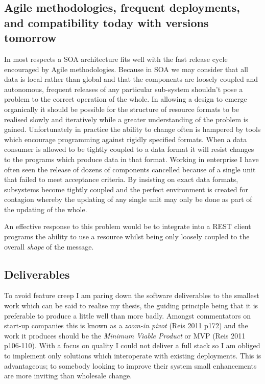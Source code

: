 \documentclass[12pt, ]{article}
\begin{document}
\subsection{Agile methodologies, frequent deployments, and compatibility
today with versions
tomorrow}\label{agile-methodologies-frequent-deployments-and-compatibility-today-with-versions-tomorrow}

In most respects a SOA architecture fits well with the fast release
cycle encouraged by Agile methodologies. Because in SOA we may consider
that all data is local rather than global and that the components are
loosely coupled and autonomous, frequent releases of any particular
sub-system shouldn't pose a problem to the correct operation of the
whole. In allowing a design to emerge organically it should be possible
for the structure of resource formats to be realised slowly and
iteratively while a greater understanding of the problem is gained.
Unfortunately in practice the ability to change often is hampered by
tools which encourage programming against rigidly specified formats.
When a data consumer is allowed to be tightly coupled to a data format
it will resist changes to the programs which produce data in that
format. Working in enterprise I have often seen the release of dozens of
components cancelled because of a single unit that failed to meet
acceptance criteria. By insisting on exact data formats, subsystems
become tightly coupled and the perfect environment is created for
contagion whereby the updating of any single unit may only be done as
part of the updating of the whole.

An effective response to this problem would be to integrate into a REST
client programs the ability to use a resource whilst being only loosely
coupled to the overall \emph{shape} of the message.

\subsection{Deliverables}\label{deliverables}

To avoid feature creep I am paring down the software deliverables to the
smallest work which can be said to realise my thesis, the guiding
principle being that it is preferable to produce a little well than more
badly. Amongst commentators on start-up companies this is known as a
\emph{zoom-in pivot} (Reis 2011 p172) and the work it produces should be
the \emph{Minimum Viable Product} or MVP (Reis 2011 p106-110). With a
focus on quality I could not deliver a full stack so I am obliged to
implement only solutions which interoperate with existing deployments.
This is advantageous; to somebody looking to improve their system small
enhancements are more inviting than wholesale change.
\end{document}
